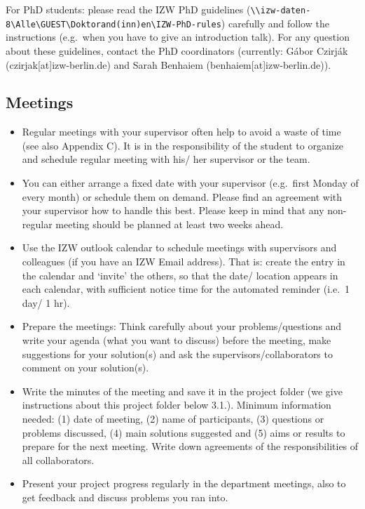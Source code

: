 \documentclass[
  english,
]{article}
\providecommand{\tightlist}{%
  \setlength{\itemsep}{0pt}\setlength{\parskip}{0pt}}
\begin{document}
For PhD students: please read the IZW PhD guidelines
(\texttt{\textbackslash{}\textbackslash{}izw-daten-8\textbackslash{}Alle\textbackslash{}GUEST\textbackslash{}Doktorand(inn)en\textbackslash{}IZW-PhD-rules})
carefully and follow the instructions (e.g.~when you have to give an
introduction talk). For any question about these guidelines, contact the
PhD coordinators (currently: Gábor Czirják
(czirjak{[}at{]}izw-berlin.de) and Sarah Benhaiem
(benhaiem{[}at{]}izw-berlin.de)).

\hypertarget{meetings}{%
\subsection{Meetings}\label{meetings}}

\begin{itemize}
\tightlist
\item
  Regular meetings with your supervisor often help to avoid a waste of
  time (see also Appendix C). It is in the responsibility of the student
  to organize and schedule regular meeting with his/ her supervisor or
  the team.
\item
  You can either arrange a fixed date with your supervisor (e.g.~first
  Monday of every month) or schedule them on demand. Please find an
  agreement with your supervisor how to handle this best. Please keep in
  mind that any non-regular meeting should be planned at least two weeks
  ahead.
\item
  Use the IZW outlook calendar to schedule meetings with supervisors and
  colleagues (if you have an IZW Email address). That is: create the
  entry in the calendar and `invite' the others, so that the date/
  location appears in each calendar, with sufficient notice time for the
  automated reminder (i.e.~1 day/ 1 hr).
\item
  Prepare the meetings: Think carefully about your problems/questions
  and write your agenda (what you want to discuss) before the meeting,
  make suggestions for your solution(s) and ask the
  supervisors/collaborators to comment on your solution(s).
\item
  Write the minutes of the meeting and save it in the project folder (we
  give instructions about this project folder below 3.1.). Minimum
  information needed: (1) date of meeting, (2) name of participants, (3)
  questions or problems discussed, (4) main solutions suggested and (5)
  aims or results to prepare for the next meeting. Write down agreements
  of the responsibilities of all collaborators.
\item
  Present your project progress regularly in the department meetings,
  also to get feedback and discuss problems you ran into.
\end{itemize}
\end{document}
